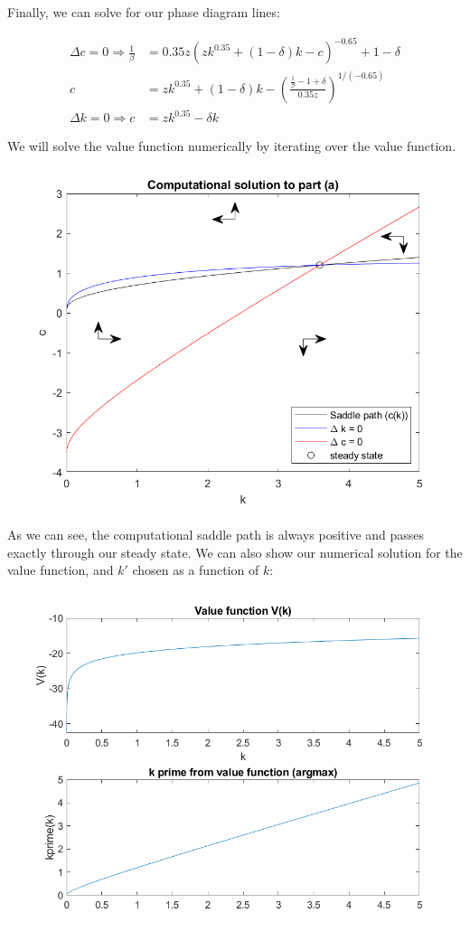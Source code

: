 \documentclass[11pt]{article} %
\begin{document}
Finally, we can solve for our phase diagram lines:

\begin{align*}
\Delta c= 0 \Rightarrow \frac{1}{\beta} &= 0.35z(zk^{0.35} + (1-\delta)k - c )^{-0.65} + 1 - \delta\\
c&= zk^{0.35} + (1-\delta)k -\left(\frac{\frac{1}{\beta} - 1 + \delta}{0.35 z}\right)^{1/(-0.65)}\\
\Delta k = 0 \Rightarrow c &= zk^{0.35} - \delta k
\end{align*}

We will solve the value function numerically by iterating over the value function.

\includegraphics{partA}

As we can see, the computational saddle path is always positive and passes exactly through our steady state. We can also show our numerical solution for the value function, and $k'$ chosen as a function of $k$:

\includegraphics{partA2}
\end{document}
